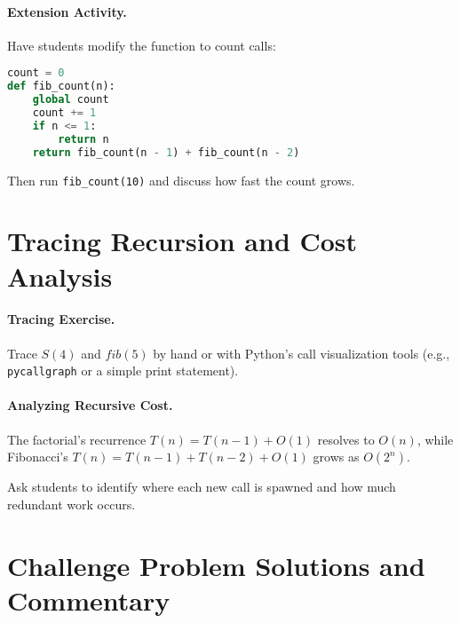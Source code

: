 \paragraph{Extension Activity.}
Have students modify the function to count calls:
\begin{lstlisting}[language=Python]
count = 0
def fib_count(n):
    global count
    count += 1
    if n <= 1:
        return n
    return fib_count(n - 1) + fib_count(n - 2)
\end{lstlisting}
Then run \texttt{fib_count(10)} and discuss how fast the count grows.

\section{Tracing Recursion and Cost Analysis}

\paragraph{Tracing Exercise.}
Trace $S(4)$ and $fib(5)$ by hand or with Python’s call visualization tools 
(e.g., \texttt{pycallgraph} or a simple print statement).

\paragraph{Analyzing Recursive Cost.}
The factorial’s recurrence $T(n) = T(n-1) + O(1)$ resolves to $O(n)$,
while Fibonacci’s $T(n) = T(n-1) + T(n-2) + O(1)$ grows as $O(2^n)$.

Ask students to identify where each new call is spawned and how much redundant work occurs.

\section{Challenge Problem Solutions and Commentary}

